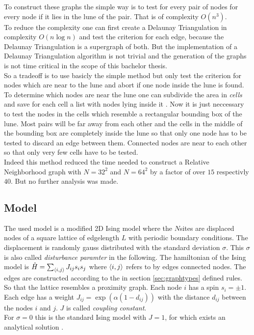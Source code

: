     To construct these graphs the simple way is to test for every
    pair of nodes for every node if it lies in the lune of the pair.
    That is of complexity \(O (n^3)\).\\
    To reduce the complexity one can first create a Delaunay
    Triangulation in complexity \(O (n \log n)\)
    \cite{Leach1992} and test the criterion for each edge, because
    the Delaunay Triangulation is a supergraph of both. But the
    implementation of a Delaunay Triangulation algorithm is not
    trivial and the generation of the graphs is not time critical in
    the scope of this bachelor thesis.\\
    So a tradeoff is to use basicly the simple method but only test
    the criterion for nodes which are near to the lune and abort if
    one node inside the lune is found. To determine which nodes are
    near the lune one can subdivide the area in \emph{cells} and save
    for each cell a list with nodes lying inside it \cite{RNGCell}.
    Now it is just neccessary to test the nodes in the cells which
    resemble a rectangular bounding box of the lune. Most pairs will be
    far away from each other and the cells in the middle of the bounding
    box are completely inside the lune so that only one node has to be
    tested to discard an edge between them. Connected nodes are near to
    each other so that only very few cells have to be tested.\\
    Indeed this method reduced the time needed to construct a Relative
    Neighborhood graph with \(N=32^2\) and \(N=64^2\) by a factor of
    over \(15\) respectivly \(40\). But no further analysis was made.

\subsection{Model}
\label{ssec:isingmodel}
    The used model is a modified 2D Ising model where the \(N\)sites are
    displaced nodes of a square lattice of edgelength \(L\) with
    periodic boundary conditions. The displacement is randomly gauss
    distributed with the standard deviation \(\sigma\). This \(\sigma\)
    is also called \emph{disturbance paramter} in the following.
    The hamiltonian of the Ising model is
    \(\hat{H} = \sum_{\left< i,j \right>}J_{ij}s_{i}s_{j}\)
    where \(\left< i,j \right>\) refers to by edges connected nodes.
    The edges are constructed according to the in section
    \ref{sec:graphtypes} defined rules. So that the lattice resembles a
    proximity graph. Each node \(i\) has a spin \(s_i = \pm 1\). Each
    edge has a weight \(J_{ij} = \exp (\alpha (1-d_{ij}))\) with the
    distance \(d_{ij}\) between the nodes \(i\) and \(j\). \(J\) is
    called \emph{coupling constant}.\\
    For \(\sigma = 0\) this is the standard Ising model with \(J = 1\),
    for which exists an analytical solution \cite{Onsager1944}.\\


